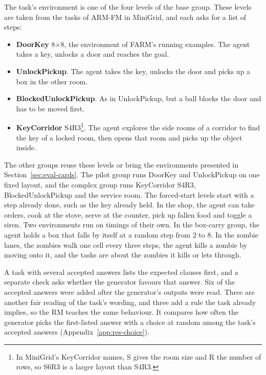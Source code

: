 \documentclass[11pt,english,listoffigures,listoftables]{tfgetsinf}
\begin{document}
The task's environment is one of the four levels of the base group. These levels are taken from the tasks of ARM-FM in MiniGrid, and each asks for a list of steps:
\begin{itemize}
    \item \textbf{DoorKey} 8$\times$8, the environment of FARM's running examples. The agent takes a key, unlocks a door and reaches the goal.
    \item \textbf{UnlockPickup}. The agent takes the key, unlocks the door and picks up a box in the other room.
    \item \textbf{BlockedUnlockPickup}. As in UnlockPickup, but a ball blocks the door and has to be moved first.
    \item \textbf{KeyCorridor} S4R3\footnote{In MiniGrid's KeyCorridor names, S gives the room size and R the number of rows, so S6R3 is a larger layout than S4R3.}. The agent explores the side rooms of a corridor to find the key of a locked room, then opens that room and picks up the object inside.
\end{itemize}
\noindent The other groups reuse these levels or bring the environments presented in Section~\ref{sec:eval-cards}. The pilot group runs DoorKey and UnlockPickup on one fixed layout, and the complex group runs KeyCorridor S4R3, BlockedUnlockPickup and the service room. The forced-start levels start with a step already done, such as the key already held. In the shop, the agent can take orders, cook at the stove, serve at the counter, pick up fallen food and toggle a siren. Two environments run on timings of their own. In the box-carry group, the agent holds a box that falls by itself at a random step from 2 to 8. In the zombie lanes, the zombies walk one cell every three steps, the agent kills a zombie by moving onto it, and the tasks are about the zombies it kills or lets through.

A task with several accepted answers lists the expected clauses first, and a separate check asks whether the generator favours that answer. Six of the accepted answers were added after the generator's outputs were read. Three are another fair reading of the task's wording, and three add a rule the task already implies, so the RM teaches the same behaviour. It compares how often the generator picks the first-listed answer with a choice at random among the task's accepted answers (Appendix~\ref{app:res-choice}).
\end{document}

